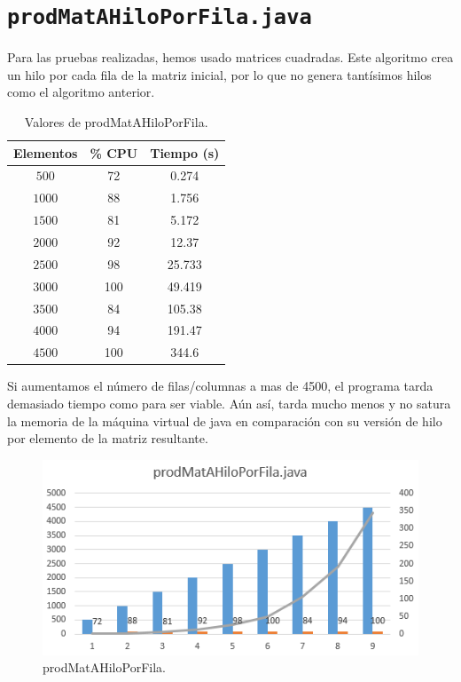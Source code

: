 \documentclass[12pt,letterpaper]{article}
\begin{document}
\section{\texttt{prodMatAHiloPorFila.java}}
\noindent
Para las pruebas realizadas, hemos usado matrices cuadradas. Este algoritmo crea un hilo por cada fila de la matriz inicial, por lo que no genera tantísimos hilos como el algoritmo anterior.
\begin{center}
	\begin{table}[htbp]
		\begin{center}
			\begin{tabular}{|c|c|c|}
				\hline
				\textbf{Elementos} & \textbf{\% CPU} & \textbf{Tiempo (s)}  \\
				\hline 
				$500$ & 72 & 0.274\\ \hline	
				$1000$ & 88 & 1.756\\ \hline
				$1500$ & 81 & 5.172\\ \hline
				$2000$ & 92 & 12.37\\ \hline
				$2500$ & 98 & 25.733\\ \hline
				$3000$ & 100 & 49.419\\ \hline
				$3500$ & 84 & 105.38\\ \hline
				$4000$ & 94 & 191.47\\ \hline
				$4500$ & 100 & 344.6\\ \hline	
			\end{tabular}
			\caption{Valores de prodMatAHiloPorFila.}
			\label{tabla:Valores de prodMatAHiloPorFila}
		\end{center}
	\end{table}
\end{center}
\noindent
Si aumentamos el número de filas/columnas a mas de 4500, el programa tarda demasiado tiempo como para ser viable. Aún así, tarda mucho menos y no satura la memoria de la máquina virtual de java en comparación con su versión de hilo por elemento de la matriz resultante.
\begin{figure}
	\begin{center}
		\includegraphics[scale=1]{prodMatAHiloPorFilaf.png}
		\caption{prodMatAHiloPorFila.}
		\label{fig: prodMatAHiloPorFila}
	\end{center}	
\end{figure}
\end{document}
